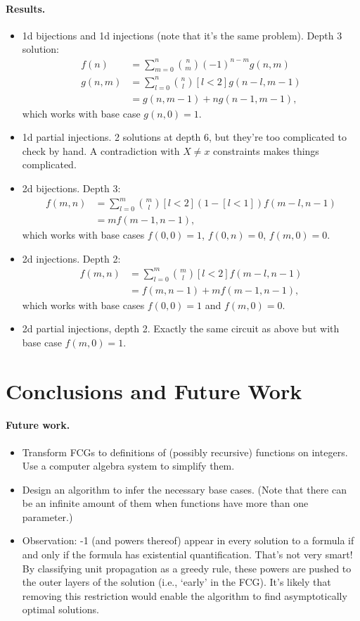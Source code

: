 \paragraph{Results.}
\begin{itemize}
\item 1d bijections and 1d injections (note that it's the same problem). Depth 3 solution:
  \begin{align*}
    f(n) &= \sum_{m=0}^n \binom{n}{m} (-1)^{n-m}g(n, m) \\
    g(n, m) &= \sum_{l=0}^n \binom{n}{l}[l < 2]g(n-l, m-1) \\
    &= g(n, m - 1) + ng(n - 1, m - 1),
  \end{align*}
  which works with base case $g(n, 0) = 1$.
\item 1d partial injections. 2 solutions at depth 6, but they're too complicated to check by hand. A contradiction with $X \ne x$ constraints makes things complicated.
\item 2d bijections. Depth 3:
  \begin{align*}
    f(m, n) &= \sum_{l=0}^m \binom{m}{l} [l < 2] (1 - [l < 1])f(m-l, n-1) \\
    &= mf(m-1, n-1),
  \end{align*}
  which works with base cases $f(0, 0) = 1$, $f(0, n) = 0$, $f(m, 0) = 0$.
\item 2d injections. Depth 2:
  \begin{align*}
    f(m, n) &= \sum_{l=0}^m \binom{m}{l}[l<2]f(m-l, n-1) \\
    &= f(m, n-1) + mf(m-1, n-1),
  \end{align*}
  which works with base cases $f(0, 0) = 1$ and $f(m, 0) = 0$.
\item 2d partial injections, depth 2. Exactly the same circuit as above but with base case $f(m, 0) = 1$.
\end{itemize}

\section{Conclusions and Future Work}

\paragraph{Future work.}
\begin{itemize}
\item Transform FCGs to definitions of (possibly recursive) functions on integers. Use a computer algebra system to simplify them.
\item Design an algorithm to infer the necessary base cases. (Note that there can be an infinite amount of them when functions have more than one parameter.)
\item Observation: -1 (and powers thereof) appear in every solution to a formula if and only if the formula has existential quantification. That's not very smart! By classifying unit propagation as a greedy rule, these powers are pushed to the outer layers of the solution (i.e., `early' in the FCG). It's likely that removing this restriction would enable the algorithm to find asymptotically optimal solutions.
\end{itemize}
